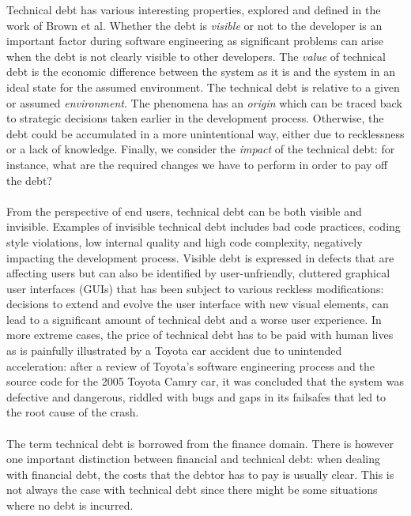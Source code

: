 \noindent Technical debt has various interesting properties, explored and defined in the work of Brown et al\cite{brown2010managing}. 
Whether the debt is \emph{visible} or not to the developer is an important factor during software engineering as significant problems can arise when the debt is not clearly visible to other developers.
The \emph{value} of technical debt is the economic difference between the system as it is and the system in an ideal state for the assumed environment.
The technical debt is relative to a given or assumed \emph{environment}.
The phenomena has an \emph{origin} which can be traced back to strategic decisions taken earlier in the development process. Otherwise, the debt could be accumulated in a more unintentional way, either due to recklessness or a lack of knowledge.
Finally, we consider the \emph{impact} of the technical debt: for instance, what are the required changes we have to perform in order to pay off the debt?\\\\
From the perspective of end users, technical debt can be both visible and invisible\cite{kruchten2012technical}.
Examples of invisible technical debt includes bad code practices, coding style violations, low internal quality and high code complexity, negatively impacting the development process.
Visible debt is expressed in defects that are affecting users but can also be identified by user-unfriendly, cluttered graphical user interfaces (GUIs) that has been subject to various reckless modifications: decisions to extend and evolve the user interface with new visual elements, can lead to a significant amount of technical debt and a worse user experience.
In more extreme cases, the price of technical debt has to be paid with human lives as is painfully illustrated by a Toyota car accident due to unintended acceleration: after a review of Toyota’s software engineering process and the source code for the 2005 Toyota Camry car, it was concluded that the system was defective and dangerous, riddled with bugs and gaps in its failsafes that led to the root cause of the crash\cite{toyotatechnicaldebt}.\\\\
The term technical debt is borrowed from the finance domain\cite{guo2011portfolio}.
There is however one important distinction between financial and technical debt: when dealing with financial debt, the costs that the debtor has to pay is usually clear.
This is not always the case with technical debt since there might be some situations where no debt is incurred.
